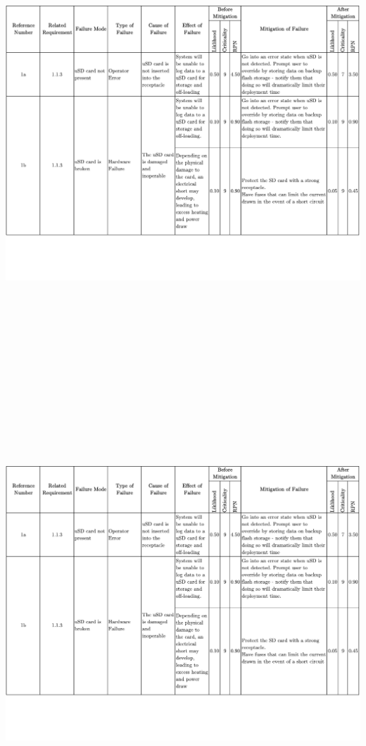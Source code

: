\begin{landscape}
		\newpage
		\includegraphics[height=6.75in, page=4]{../include/ThetisFMECA.pdf}
		\newpage
		\includegraphics[height=6.75in, page=5]{../include/ThetisFMECA.pdf}

\end{landscape}
